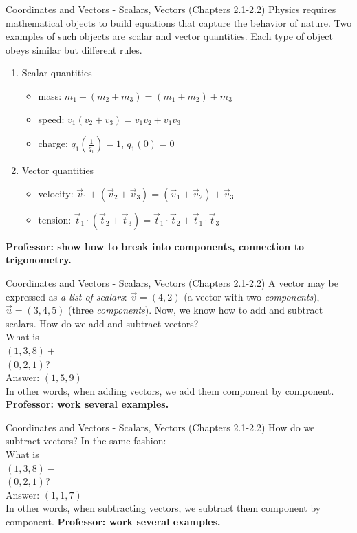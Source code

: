 \documentclass{beamer}
\begin{document}
\begin{frame}{Coordinates and Vectors - Scalars, Vectors (Chapters 2.1-2.2)}
Physics requires \alert{mathematical objects} to build equations that capture the behavior of nature.  Two examples of such objects are \alert{scalar} and \alert{vector} quantities.  Each type of object obeys similar but different rules.
\begin{enumerate}
\item Scalar quantities
\begin{itemize}
\item mass: $m_1+(m_2+m_3) = (m_1+m_2)+m_3$
\item speed: $v_1(v_2+v_3) = v_1v_2+v_1v_3$
\item charge: $q_1 \left(\frac{1}{q_1}\right) = 1$, $q_1(0) = 0$
\end{itemize}
\item Vector quantities
\begin{itemize}
\item velocity: $\vec{v}_1 + (\vec{v}_2+\vec{v}_3) = (\vec{v}_1 + \vec{v}_2)+\vec{v}_3$
\item tension: $\vec{t}_1 \cdot (\vec{t}_2 + \vec{t}_3) = \vec{t}_1 \cdot \vec{t}_2 + \vec{t}_1 \cdot \vec{t}_3$
\end{itemize}
\end{enumerate}
\textbf{Professor: show how to break into components, connection to trigonometry.}
\end{frame}

\begin{frame}{Coordinates and Vectors - Scalars, Vectors (Chapters 2.1-2.2)}
A vector may be expressed as \textit{a list of scalars}: $\vec{v} = (4,2)$ (a vector with two \textit{components}), $\vec{u} = (3,4,5)$ (three \textit{components}).  Now, we know how to add and subtract scalars.  How do we add and subtract vectors? \\
\vspace{0.5cm}
What is\\
$(1,3,8)+$\\ $(0,2,1)$? \\
Answer: $(1,5,9)$ \\
\vspace{0.5cm}
In other words, when adding vectors, we add them component by component. \textbf{Professor: work several examples.}
\end{frame}

\begin{frame}{Coordinates and Vectors - Scalars, Vectors (Chapters 2.1-2.2)}
How do we subtract vectors? In the same fashion:\\
\vspace{0.5cm}
What is\\
$(1,3,8)-$\\ $(0,2,1)$? \\
Answer: $(1,1,7)$ \\
\vspace{0.5cm}
In other words, when subtracting vectors, we subtract them component by component. \textbf{Professor: work several examples.}
\end{frame}
\end{document}
